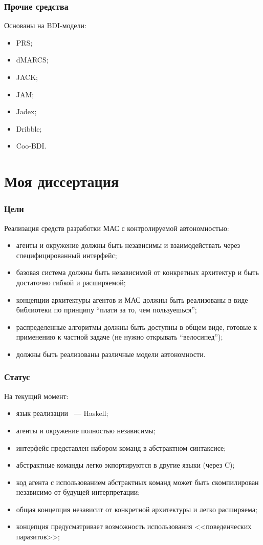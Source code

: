 \documentclass{beamer}
\begin{document}
\begin{frame}
  \frametitle{Прочие средства}
  Основаны на BDI-модели:
  \begin{itemize}
    \item PRS;
    \item dMARCS;
    \item JACK;
    \item JAM;
    \item Jadex;
    \item Dribble;
    \item Coo-BDI.
  \end{itemize}
\end{frame}

\section{Моя диссертация}

\begin{frame}
  \frametitle{Цели}
  Реализация средств разработки МАС с контролируемой автономностью:
  \begin{itemize}
    \item агенты и окружение должны быть независимы и взаимодействать через
      специфицированный интерфейс;
    \item базовая система должны быть независимой от конкретных архитектур и
      быть достаточно гибкой и расширяемой;
    \item концепции архитектуры агентов и МАС должны быть реализованы в виде библиотеки
      по принципу ``плати за то, чем пользуешься'';
    \item распределенные алгоритмы должны быть доступны в общем виде, готовые к применению
      к частной задаче (не нужно открывать ``велосипед'');
    \item должны быть реализованы различные модели автономности.
  \end{itemize}
\end{frame}

\begin{frame}
  \frametitle{Статус}
  На текущий момент:
  \begin{itemize}
    \item язык реализации ~--- Haskell;
    \item агенты и окружение полностью независимы;
    \item интерфейс представлен набором команд в абстрактном синтаксисе;
    \item абстрактные команды легко экпортируются в другие языки (через C);
    \item код агента с использованием абстрактных команд может быть скомпилирован
      независимо от будущей интерпретации;
    \item общая концепция независит от конкретной архитектуры и легко расширяема;
    \item концепция предусматривает возможность использования <<поведенческих паразитов>>;
  \end{itemize}
\end{frame}
\end{document}
